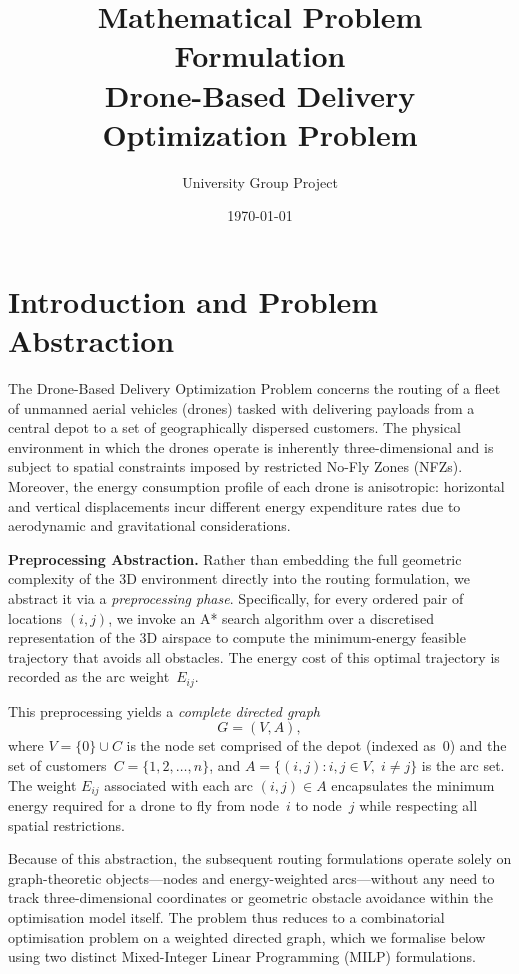 \documentclass[11pt,a4paper]{article}
\title{\textbf{Mathematical Problem Formulation}\\[0.3em]
\large Drone-Based Delivery Optimization Problem}
\author{University Group Project}
\date{\today}
\begin{document}
\maketitle

\section{Introduction and Problem Abstraction}

The Drone-Based Delivery Optimization Problem concerns the routing of a fleet of unmanned aerial vehicles (drones) tasked with delivering payloads from a central depot to a set of geographically dispersed customers. The physical environment in which the drones operate is inherently three-dimensional and is subject to spatial constraints imposed by restricted No-Fly Zones (NFZs). Moreover, the energy consumption profile of each drone is anisotropic: horizontal and vertical displacements incur different energy expenditure rates due to aerodynamic and gravitational considerations.

\medskip

\noindent\textbf{Preprocessing Abstraction.}
Rather than embedding the full geometric complexity of the 3D environment directly into the routing formulation, we abstract it via a \emph{preprocessing phase}. Specifically, for every ordered pair of locations $(i, j)$, we invoke an A* search algorithm over a discretised representation of the 3D airspace to compute the minimum-energy feasible trajectory that avoids all obstacles. The energy cost of this optimal trajectory is recorded as the arc weight~$E_{ij}$.

This preprocessing yields a \emph{complete directed graph}
\[
  G = (V, A),
\]
where $V = \{0\} \cup C$ is the node set comprised of the depot (indexed as~$0$) and the set of customers~$C = \{1, 2, \ldots, n\}$, and $A = \{(i,j) : i, j \in V,\; i \neq j\}$ is the arc set. The weight $E_{ij}$ associated with each arc $(i,j) \in A$ encapsulates the minimum energy required for a drone to fly from node~$i$ to node~$j$ while respecting all spatial restrictions.

\medskip

Because of this abstraction, the subsequent routing formulations operate solely on graph-theoretic objects---nodes and energy-weighted arcs---without any need to track three-dimensional coordinates or geometric obstacle avoidance within the optimisation model itself. The problem thus reduces to a combinatorial optimisation problem on a weighted directed graph, which we formalise below using two distinct Mixed-Integer Linear Programming (MILP) formulations.
\end{document}
